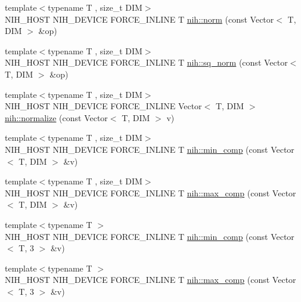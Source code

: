 \begin{DoxyCompactItemize}
\item 
{\footnotesize template$<$typename T , size\-\_\-t \-D\-I\-M$>$ }\\\-N\-I\-H\-\_\-\-H\-O\-S\-T \-N\-I\-H\-\_\-\-D\-E\-V\-I\-C\-E \-F\-O\-R\-C\-E\-\_\-\-I\-N\-L\-I\-N\-E \-T \hyperlink{group__vectors_gaef3221bb95a71d1743f7df1673082cbf}{nih\-::norm} (const \-Vector$<$ \-T, \-D\-I\-M $>$ \&op)
\item 
{\footnotesize template$<$typename T , size\-\_\-t \-D\-I\-M$>$ }\\\-N\-I\-H\-\_\-\-H\-O\-S\-T \-N\-I\-H\-\_\-\-D\-E\-V\-I\-C\-E \-F\-O\-R\-C\-E\-\_\-\-I\-N\-L\-I\-N\-E \-T \hyperlink{group__vectors_ga9c4ac20ce07631b820678349b4c46698}{nih\-::sq\-\_\-norm} (const \-Vector$<$ \-T, \-D\-I\-M $>$ \&op)
\item 
{\footnotesize template$<$typename T , size\-\_\-t \-D\-I\-M$>$ }\\\-N\-I\-H\-\_\-\-H\-O\-S\-T \-N\-I\-H\-\_\-\-D\-E\-V\-I\-C\-E \*
\-F\-O\-R\-C\-E\-\_\-\-I\-N\-L\-I\-N\-E \-Vector$<$ \-T, \-D\-I\-M $>$ \hyperlink{group__vectors_gae244399ef06f44b09f0a908aa406c037}{nih\-::normalize} (const \-Vector$<$ \-T, \-D\-I\-M $>$ v)
\item 
{\footnotesize template$<$typename T , size\-\_\-t \-D\-I\-M$>$ }\\\-N\-I\-H\-\_\-\-H\-O\-S\-T \-N\-I\-H\-\_\-\-D\-E\-V\-I\-C\-E \-F\-O\-R\-C\-E\-\_\-\-I\-N\-L\-I\-N\-E \-T \hyperlink{group__vectors_ga643f06fe0c1d7d9d1ae9fe81e61c389e}{nih\-::min\-\_\-comp} (const \-Vector$<$ \-T, \-D\-I\-M $>$ \&v)
\item 
{\footnotesize template$<$typename T , size\-\_\-t \-D\-I\-M$>$ }\\\-N\-I\-H\-\_\-\-H\-O\-S\-T \-N\-I\-H\-\_\-\-D\-E\-V\-I\-C\-E \-F\-O\-R\-C\-E\-\_\-\-I\-N\-L\-I\-N\-E \-T \hyperlink{group__vectors_gab4b34a60142a60bb290dfba1709c85f4}{nih\-::max\-\_\-comp} (const \-Vector$<$ \-T, \-D\-I\-M $>$ \&v)
\item 
{\footnotesize template$<$typename T $>$ }\\\-N\-I\-H\-\_\-\-H\-O\-S\-T \-N\-I\-H\-\_\-\-D\-E\-V\-I\-C\-E \-F\-O\-R\-C\-E\-\_\-\-I\-N\-L\-I\-N\-E \-T \hyperlink{group__vectors_ga0d2289c0f68f0b9f497a1e4bc62399e0}{nih\-::min\-\_\-comp} (const \-Vector$<$ \-T, 3 $>$ \&v)
\item 
{\footnotesize template$<$typename T $>$ }\\\-N\-I\-H\-\_\-\-H\-O\-S\-T \-N\-I\-H\-\_\-\-D\-E\-V\-I\-C\-E \-F\-O\-R\-C\-E\-\_\-\-I\-N\-L\-I\-N\-E \-T \hyperlink{group__vectors_gafccc66f85211e07bb1abee7f8fc0a281}{nih\-::max\-\_\-comp} (const \-Vector$<$ \-T, 3 $>$ \&v)

\end{DoxyCompactItemize}

